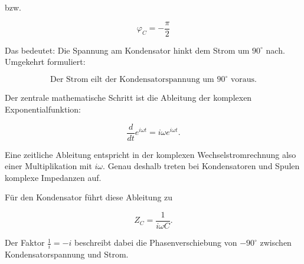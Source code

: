 bzw.

\[
\boxed{
	\varphi_C=-\frac{\pi}{2}
}
\]

Das bedeutet: Die Spannung am Kondensator hinkt dem Strom um $90^\circ$ nach.
Umgekehrt formuliert:

\[
\boxed{
	\text{Der Strom eilt der Kondensatorspannung um }90^\circ\text{ voraus.}
}
\]

\begin{DidacticBox}
	\label{box:warum-i-omega-auftaucht}
	
	Der zentrale mathematische Schritt ist die Ableitung der komplexen
	Exponentialfunktion:
	
	\[
	\frac{d}{dt}e^{i\omega t}
	=
	i\omega e^{i\omega t}.
	\]
	
	Eine zeitliche Ableitung entspricht in der komplexen Wechselstromrechnung also
	einer Multiplikation mit $i\omega$. Genau deshalb treten bei Kondensatoren und
	Spulen komplexe Impedanzen auf.
	
	Für den Kondensator führt diese Ableitung zu
	
	\[
	Z_C=\frac{1}{i\omega C}.
	\]
	
	Der Faktor $\frac{1}{i}=-i$ beschreibt dabei die Phasenverschiebung von
	$-90^\circ$ zwischen Kondensatorspannung und Strom.
\end{DidacticBox}